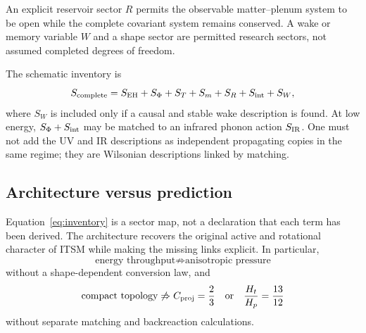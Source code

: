 An explicit reservoir sector $R$ permits the observable matter--plenum system
to be open while the complete covariant system remains conserved.  A wake or
memory variable $W$ and a shape sector are permitted research sectors, not
assumed completed degrees of freedom.

The schematic inventory is
\begin{equation}
 S_{\rm complete}=
 S_{\rm EH}+S_{\Phi}+S_T+S_m+S_R
 +S_{\rm int}+S_W,
 \label{eq:inventory}
\end{equation}
where $S_W$ is included only if a causal and stable wake description is found.
At low energy, $S_\Phi+S_{\rm int}$ may be matched to an infrared phonon action
$S_{\rm IR}$.  One must not add the UV and IR descriptions as independent
propagating copies in the same regime; they are Wilsonian descriptions linked
by matching.

\subsection{Architecture versus prediction}

Equation~\eqref{eq:inventory} is a sector map, not a declaration that each term
has been derived.  The architecture recovers the original active and
rotational character of ITSM while making the missing links explicit.  In
particular,
\begin{equation}
 \text{energy throughput}
 \not\Rightarrow
 \text{anisotropic pressure}
\end{equation}
without a shape-dependent conversion law, and
\begin{equation}
 \text{compact topology}
 \not\Rightarrow
 C_{\mathrm{proj}}=\frac23 \quad\text{or}\quad \frac{H_t}{H_p}=\frac{13}{12}
\end{equation}
without separate matching and backreaction calculations.
